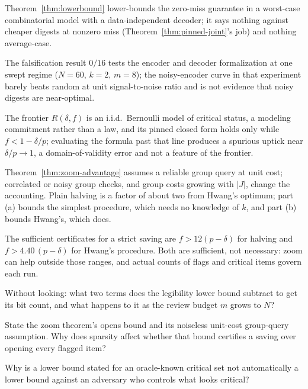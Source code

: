 \documentclass[11pt,a4paper]{article}
\theoremstyle{definition}
\theoremstyle{plain}
\begin{document}
\begin{pdboundary}
\setlength{\parskip}{4pt plus 1pt}
Theorem~\ref{thm:lowerbound} lower-bounds the zero-miss guarantee in a worst-case
combinatorial model with a data-independent decoder; it says nothing against
cheaper digests at nonzero miss (Theorem~\ref{thm:pinned-joint}'s job) and nothing
average-case.

The falsification result $0/16$ tests the encoder and decoder
formalization at one swept regime ($N{=}60$, $k{=}2$, $m{=}8$); the noisy-encoder
curve in that experiment barely beats random at unit signal-to-noise ratio and is
not evidence that noisy digests are near-optimal.

The frontier $R(\delta,f)$ is an
i.i.d.\ Bernoulli model of critical status, a modeling commitment rather than a
law, and its pinned closed form holds only while $f<1-\delta/p$; evaluating
the formula past that line produces a spurious uptick near
$\delta/p\to1$, a domain-of-validity error and not a feature of the frontier.

Theorem~\ref{thm:zoom-advantage} assumes a reliable group query at unit cost;
correlated or noisy group checks, and group costs growing with $|J|$, change the
accounting. Plain halving is a factor of about two from Hwang's optimum; part
(a) bounds the simplest procedure, which needs no knowledge of $k$, and part (b)
bounds Hwang's, which does.

The sufficient certificates for a strict saving are $f>12(p-\delta)$ for halving
and $f>4.40\,(p-\delta)$ for Hwang's procedure. Both are sufficient, not
necessary: zoom can help outside those ranges, and actual counts of flags and
critical items govern each run.
\end{pdboundary}

\pdexercisepointer*{\ref{ex:ls-readpoverty-binding}}{\ref{ex:ls-b1-frontier-run}}{\pageref{ex:ls-readpoverty-binding}}

\begin{pdrecitation}
\item Without looking: what two terms does the legibility lower bound subtract to get its bit count, and what happens to it as the review budget $m$ grows to $N$?
\item State the zoom theorem's opens bound and its noiseless unit-cost
group-query assumption. Why does sparsity affect whether that bound
certifies a saving over opening every flagged item?
\item Why is a lower bound stated for an oracle-known critical set not automatically a lower bound against an adversary who controls what looks critical?
\end{pdrecitation}
\end{document}
